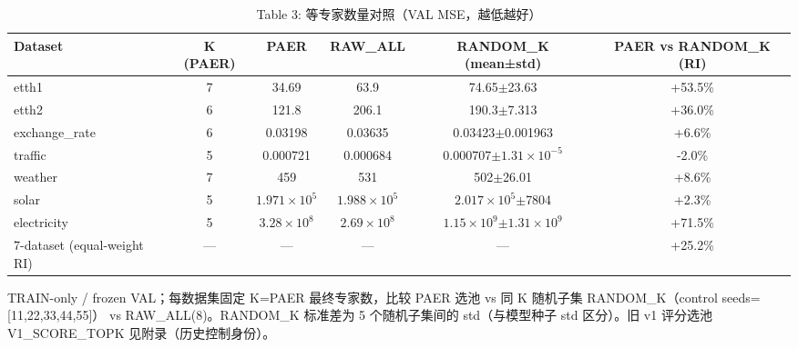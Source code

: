 \begin{table}[htbp]
  \centering
  \caption{Table 3: 等专家数量对照（VAL MSE，越低越好）}
  \label{tab:poolsize}
  \begin{tabular}{lccccc}
    \toprule
    Dataset & K (PAER) & PAER & RAW\_ALL & RANDOM\_K (mean±std) & PAER vs RANDOM\_K (RI) \\
    \midrule
    etth1 & 7 & 34.69 & 63.9 & 74.65$\pm$23.63 & +53.5\% \\
    etth2 & 6 & 121.8 & 206.1 & 190.3$\pm$7.313 & +36.0\% \\
    exchange\_rate & 6 & 0.03198 & 0.03635 & 0.03423$\pm$0.001963 & +6.6\% \\
    traffic & 5 & 0.000721 & 0.000684 & 0.000707$\pm$$1.31\times10^{-5}$ & -2.0\% \\
    weather & 7 & 459 & 531 & 502$\pm$26.01 & +8.6\% \\
    solar & 5 & $1.971\times10^{5}$ & $1.988\times10^{5}$ & $2.017\times10^{5}$$\pm$7804 & +2.3\% \\
    electricity & 5 & $3.28\times10^{8}$ & $2.69\times10^{8}$ & $1.15\times10^{9}$$\pm$$1.31\times10^{9}$ & +71.5\% \\
    7-dataset (equal-weight RI) & — & — & — & — & +25.2\% \\
    \bottomrule
  \end{tabular}
  {\footnotesize TRAIN-only / frozen VAL；每数据集固定 K=PAER 最终专家数，比较 PAER 选池 vs 同 K 随机子集 RANDOM\_K（control seeds=[11,22,33,44,55]） vs RAW\_ALL(8)。RANDOM\_K 标准差为 5 个随机子集间的 std（与模型种子 std 区分）。旧 v1 评分选池 V1\_SCORE\_TOPK 见附录（历史控制身份）。}
\end{table}
